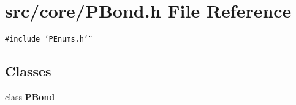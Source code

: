 \section{src/core/PBond.h File Reference}
\label{PBond_8h}


{\tt \#include \char`\"{}PEnums.h\char`\"{}}\par
\subsection*{Classes}
\begin{CompactItemize}
\item 
class {\bf PBond}
\end{CompactItemize}
